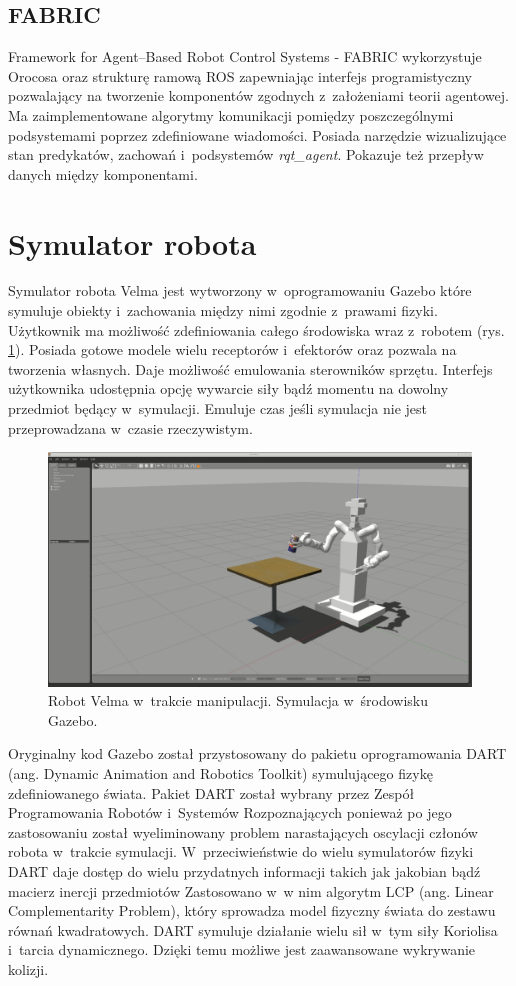 	\subsection{FABRIC}
	Framework for Agent–Based Robot Control Systems - FABRIC\cite{bib:fabric} wykorzystuje Orocosa oraz strukturę ramową ROS zapewniając interfejs programistyczny pozwalający na tworzenie komponentów zgodnych z~założeniami teorii agentowej. Ma zaimplementowane algorytmy komunikacji pomiędzy poszczególnymi podsystemami poprzez zdefiniowane wiadomości. Posiada narzędzie wizualizujące stan predykatów, zachowań i~podsystemów \textit{rqt\_agent}\cite{bib:rqtAgent}. Pokazuje też przepływ danych między komponentami.

	
	\section{Symulator robota}
	Symulator robota Velma jest wytworzony w~oprogramowaniu Gazebo \cite{bib:Gazebo} które symuluje obiekty i~zachowania między nimi zgodnie z~prawami fizyki. Użytkownik ma możliwość zdefiniowania całego środowiska wraz z~robotem (rys. \ref{fig:gazebo}). Posiada gotowe modele wielu receptorów i~efektorów oraz pozwala na tworzenia własnych. Daje możliwość emulowania sterowników sprzętu. Interfejs użytkownika udostępnia opcję wywarcie siły bądź momentu na dowolny przedmiot będący w~symulacji. Emuluje czas jeśli symulacja nie jest przeprowadzana w~czasie rzeczywistym.
	
	\begin{figure}
		\centering
		\includegraphics[width=.6\textwidth]{images/gazebo.png}
		\caption{Robot Velma w~trakcie manipulacji. Symulacja w~środowisku Gazebo.}
		\label{fig:gazebo}
	\end{figure}

	Oryginalny kod Gazebo został przystosowany do pakietu oprogramowania DART (ang. Dynamic Animation and Robotics Toolkit) \cite{bib:dart} symulującego fizykę zdefiniowanego świata. Pakiet DART został wybrany przez Zespół Programowania Robotów i~Systemów Rozpoznających ponieważ po jego zastosowaniu został wyeliminowany problem narastających oscylacji członów robota w~trakcie symulacji. W~przeciwieństwie do wielu symulatorów fizyki DART daje dostęp do wielu przydatnych informacji takich jak jakobian bądź macierz inercji przedmiotów Zastosowano w~w nim algorytm LCP (ang. Linear Complementarity Problem), \cite{bib:lpcBase} który sprowadza model fizyczny świata do zestawu równań kwadratowych. DART symuluje działanie wielu sił w~tym siły Koriolisa i~tarcia dynamicznego. Dzięki temu możliwe jest zaawansowane wykrywanie kolizji. 
	
	